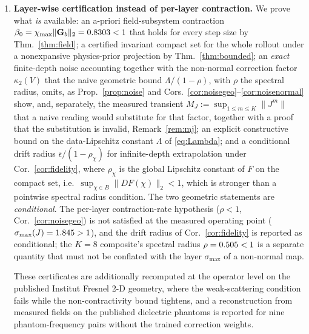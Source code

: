 \documentclass[journal,cmes,article,submit,moreauthors,pdftex]{Definitions/tsp}
\newcommand{\norm}[1]{\lVert #1 \rVert}
\newcommand{\numv}[1]{#1}
\begin{document}
\begin{enumerate}
$\sigma_{\max}(\alpha)$ over a grid, with proved and measured statements kept separate.
\item \textbf{Layer-wise certification instead of per-layer contraction.}
We prove what \emph{is} available: an a-priori field-subsystem contraction
$\beta_0=\chi_{\max}\norm{\mathbf{G}_b}_2=\numv{\betacert}<1$ that holds for every step size by Thm.~\ref{thm:field}; a certified invariant compact set for the whole rollout under a
nonexpansive physics-prior projection by Thm.~\ref{thm:bounded}; an \emph{exact} finite-depth noise
accounting together with the non-normal correction factor $\kappa_2(V)$ that the naive
geometric bound $\Lambda/(1-\rho)$, with $\rho$ the spectral radius, omits, as
Prop.~\ref{prop:noise} and Cors.~\ref{cor:noisegeo}--\ref{cor:noisenormal} show,
and, separately, the measured transient $M_J:=\sup_{1\le m\le K}\norm{J^m}$ that a naive
reading would substitute for that factor,
together with a proof that the substitution is invalid, Remark~\ref{rem:mj};
an explicit constructive bound on the data-Lipschitz constant $\Lambda$ of \eqref{eq:Lambda}; and a conditional drift radius $\bar\epsilon/(1-\rho_\chi)$ for
infinite-depth extrapolation under Cor.~\ref{cor:fidelity}, where
$\rho_\chi$ is the global Lipschitz constant of $F$ on the compact set, i.e.\ $\sup_{\chi\in B}\norm{DF(\chi)}_2<1$, which is stronger than a pointwise spectral radius condition. The two geometric statements are
\emph{conditional}. The per-layer contraction-rate hypothesis
($\rho<1$, Cor.~\ref{cor:noisegeo}) is not satisfied at the measured operating point
($\sigma_{\max}(J)=\numv{\NumPhysSigma}>1$), and the drift radius of
Cor.~\ref{cor:fidelity} is reported as conditional; the $K{=}8$ composite's spectral radius
$\rho=\numv{\NumRhoComp}<1$ is a separate quantity that must not be conflated with the layer
$\sigma_{\max}$ of a non-normal map.

These certificates are additionally recomputed at the operator level on the published
Institut Fresnel 2-D geometry, where the weak-scattering condition fails while the
non-contractivity bound tightens, and a reconstruction from measured fields on the published
dielectric phantoms is reported for nine phantom-frequency pairs without the trained correction
weights.


\end{enumerate}
\end{document}
